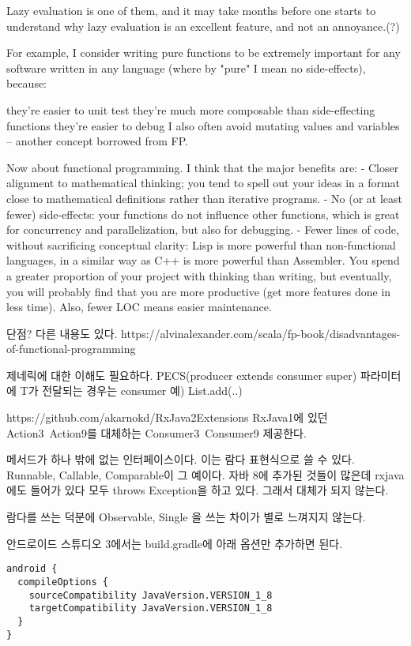 \documentclass{book}
\begin{document}
Lazy evaluation is one of them, and it may take months before one starts to understand why lazy evaluation is an excellent feature, and not an annoyance.(?)

For example, I consider writing pure functions to be extremely important for any software written in any language (where by "pure" I mean no side-effects), because:

they're easier to unit test
they're much more composable than side-effecting functions
they're easier to debug
I also often avoid mutating values and variables -- another concept borrowed from FP.

Now about functional programming. I think that the major benefits are:
- Closer alignment to mathematical thinking; you tend to spell out your ideas in a format close to mathematical definitions rather than iterative programs.
- No (or at least fewer) side-effects: your functions do not influence other functions, which is great for concurrency and parallelization, but also for debugging.
- Fewer lines of code, without sacrificing conceptual clarity: Lisp is more powerful than non-functional languages, in a similar way as C++ is more powerful than Assembler. You spend a greater proportion of your project with thinking than writing, but eventually, you will probably find that you are more productive (get more features done in less time). Also, fewer LOC means easier maintenance.


단점? 다른 내용도 있다.
https://alvinalexander.com/scala/fp-book/disadvantages-of-functional-programming

제네릭에 대한 이해도 필요하다.
PECS(producer extends consumer super)
파라미터에 T가 전달되는 경우는 consumer
예) List.add(..)


https://github.com/akarnokd/RxJava2Extensions
RxJava1에 있던 Action3~Action9를 대체하는 Consumer3~Consumer9  제공한다.

메서드가 하나 밖에 없는 인터페이스이다.
이는 람다 표현식으로 쓸 수 있다.
Runnable, Callable, Comparable이 그 예이다.
자바 8에 추가된 것들이 많은데 rxjava에도 들어가 있다
모두 throws Exception을 하고 있다. 그래서 대체가 되지 않는다.

람다를 쓰는 덕분에 Observable, Single 을 쓰는 차이가 별로 느껴지지 않는다.


안드로이드 스튜디오 3에서는 build.gradle에 아래 옵션만 추가하면 된다.
\begin{verbatim}
android {
  compileOptions {
    sourceCompatibility JavaVersion.VERSION_1_8
    targetCompatibility JavaVersion.VERSION_1_8
  }
}
\end{verbatim}
\end{document}
